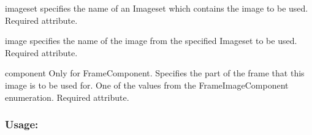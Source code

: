 \begin{DoxyItemize}
\item {\ttfamily imageset} specifies the name of an Imageset which contains the image to be used. Required attribute. \item {\ttfamily image} specifies the name of the image from the specified Imageset to be used. Required attribute. \item {\ttfamily component} Only for Frame\+Component. Specifies the part of the frame that this image is to be used for. One of the values from the Frame\+Image\+Component enumeration. Required attribute.\end{DoxyItemize}
\hypertarget{fal_element_ref_fal_elem_ref_sec_18_3}{}\subsubsection{Usage\+:}\label{fal_element_ref_fal_elem_ref_sec_18_3}

